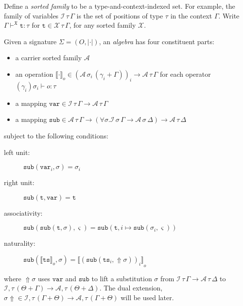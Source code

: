 \documentclass[11pt,a4paper]{article}
\newcommand*\ctxext[2]{{#1} + {#2}}
\newcommand*\InFamily[4]{\ensuremath{{#2} \vdash^{#1} {#3} : {#4}}}
\newcommand*\Litt[1]{\texttt{#1}}
\begin{document}

Define a \emph{sorted family} to be a type-and-context-indexed set. For example,
the family of variables \(\mathcal{I}\,\tau\,\Gamma\) is the set of positions of type \(\tau\) in the
context \(\Gamma\). Write \InFamily{\mathfrak{X}}{\Gamma}{\Litt{t}}{\tau} for \(\Litt{t} \in
{\mathcal{X}\,\tau\,\Gamma}\), for any sorted family \(\mathcal{X}\).

Given a signature \(\Sigma = (O , {\vert\cdot\vert})\), an \emph{algebra} has four constituent
parts:

\begin{itemize}
\item a carrier sorted family \(\mathcal{A}\)
\item an operation \({\llbracket\cdot\rrbracket}_o \in
  {{(\mathcal{A}\,\sigma_i\,(\ctxext{\gamma_i}{\Gamma}))}_i \to {\mathcal{A}\,\tau\,\Gamma}}\) for each operator
  \({(\gamma_i)\sigma_i} \vdash o : \tau\)
\item a mapping \(\mathtt{var} \in {{\mathcal{I}\,\tau\,\Gamma} \to {\mathcal{A}\,\tau\,\Gamma}}\)
\item a mapping \(\mathtt{sub} \in {{\mathcal{A}\,\tau\,\Gamma} \to (\forall \sigma. {{\mathcal{I}\,\sigma\,\Gamma} \to {\mathcal{A}\,\sigma\,\Delta}}) \to
  {\mathcal{A}\,\tau\,\Delta}}\)
\end{itemize}

subject to the following conditions:

\begin{description}
\item[left unit:] \({\mathtt{sub}(\mathtt{var}_i, \sigma)} = \sigma_i\)
\item[right unit:] \({\mathtt{sub}(\Litt{t}, \mathtt{var})} = \Litt{t}\)
\item[associativity:]
  \({\mathtt{sub}(\mathtt{sub}(\Litt{t}, \sigma), \varsigma)} =
    {\mathtt{sub}(\Litt{t}, {i \mapsto {\mathtt{sub}(\sigma_i, \varsigma)}})}\)
\item[naturality:]
  \({\mathtt{sub}({\llbracket \Litt{ts} \rrbracket}_o, \sigma)} =
    {\llbracket{(\mathtt{sub}(\Litt{ts}_i, {\Uparrow\sigma}))}_i\rrbracket}_o\)
\end{description}

where \(\Uparrow\sigma\) uses \(\mathtt{var}\) and \(\mathtt{sub}\) to lift a substitution
\(\sigma\) from \({\mathcal{I}\,\tau\,\Gamma}\to{\mathcal{A}\,\tau\,\Delta}\) to
\({\mathcal{I},\tau\,(\ctxext{\Theta}{\Gamma})}\to{\mathcal{A},\tau\,(\ctxext{\Theta}{\Delta})}\). The dual extension, \({\sigma\Uparrow} \in
  {{\mathcal{I},\tau\,(\ctxext{\Gamma}{\Theta})}\to{\mathcal{A},\tau\,(\ctxext{\Gamma}{\Theta})}}\) will be used later.
\end{document}
